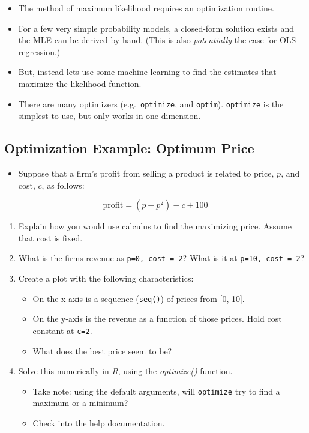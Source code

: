 \documentclass[
]{book}
\providecommand{\tightlist}{%
  \setlength{\itemsep}{0pt}\setlength{\parskip}{0pt}}
\theoremstyle{definition}
\theoremstyle{definition}
\theoremstyle{definition}
\theoremstyle{definition}
\theoremstyle{remark}
\begin{document}
\begin{itemize}
\tightlist
\item
  The method of maximum likelihood requires an optimization routine.
\item
  For a few very simple probability models, a closed-form solution exists and the MLE can be derived by hand. (This is also \emph{potentially} the case for OLS regression.)
\item
  But, instead lets use some machine learning to find the estimates that maximize the likelihood function.
\item
  There are many optimizers (e.g.~\texttt{optimize}, and \texttt{optim}). \texttt{optimize} is the simplest to use, but only works in one dimension.
\end{itemize}

\hypertarget{optimization-example-optimum-price}{%
\subsection{Optimization Example: Optimum Price}\label{optimization-example-optimum-price}}

\begin{itemize}
\tightlist
\item
  Suppose that a firm's profit from selling a product is related to price, \(p\), and cost, \(c\), as follows:
\end{itemize}

\[ 
\text{profit} = (p - p^2) - c + 100
\]

\begin{enumerate}
\def\labelenumi{\arabic{enumi}.}
\item
  Explain how you would use calculus to find the maximizing price. Assume that cost is fixed.
\item
  What is the firms revenue as \texttt{p=0,\ cost\ =\ 2}? What is it at \texttt{p=10,\ cost\ =\ 2}?
\item
  Create a plot with the following characteristics:

  \begin{itemize}
  \tightlist
  \item
    On the x-axis is a sequence (\texttt{seq()}) of prices from {[}0, 10{]}.
  \item
    On the y-axis is the revenue as a function of those prices. Hold cost constant at \texttt{c=2}.\\
  \item
    What does the best price seem to be?
  \end{itemize}
\item
  Solve this numerically in \emph{R}, using the \emph{optimize()} function.

  \begin{itemize}
  \tightlist
  \item
    Take note: using the default arguments, will \texttt{optimize} try to find a maximum or a minimum?
  \item
    Check into the help documentation.
  \end{itemize}
\end{enumerate}
\end{document}
